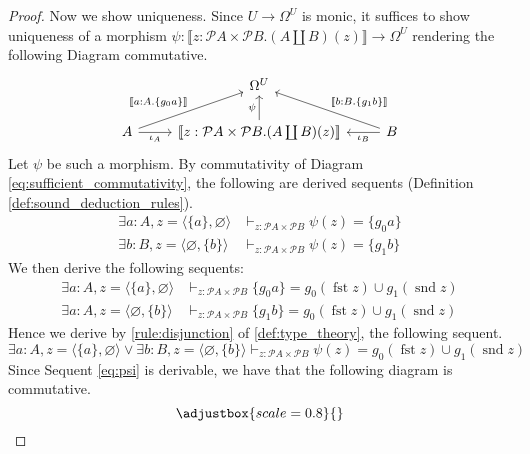 \documentclass{tac}
\newcommand{\call}[1]{\mathcal{#1}}
\newcommand{\lto}{\longrightarrow}
\begin{document}
\begin{proof}
		Now we show uniqueness. Since $U \lto \Omega^U$ is monic, it suffices to show uniqueness of a morphism $\psi: \llbracket z: \call{P}A \times \call{P}B.(A \coprod B)(z) \rrbracket \lto \Omega^U$ rendering the following Diagram commutative.
		\begin{equation}\label{eq:sufficient_commutativity}
			\begin{tikzcd}
				& \Omega^U\\
				A\arrow[ur,"{\llbracket a:A. \lbrace g_0a \rbrace\rrbracket}"]\arrow[r,swap,"{\iota_A}"] & \llbracket z : \call{P}A \times \call{P}B . (A \coprod B)(z)\rrbracket\arrow[u,"{\psi}"] & B\arrow[ul,swap,"{\llbracket b:B. \lbrace g_1b \rbrace\rrbracket}"]\arrow[l,"{\iota_B}"]
			\end{tikzcd}
		\end{equation}
		Let $\psi$ be such a morphism. By commutativity of Diagram \eqref{eq:sufficient_commutativity}, the following are derived sequents (Definition \ref{def:sound_deduction_rules}).
		\begin{align*}
			\exists a:A, z = \langle \lbrace a \rbrace, \varnothing \rangle &\vdash_{z:\call{P}A \times \call{P}B}\psi(z) = \lbrace g_0 a \rbrace\\
			\exists b:B, z = \langle \varnothing, \lbrace b \rbrace \rangle &\vdash_{z: \call{P}A \times \call{P}B} \psi(z) = \lbrace g_1 b \rbrace
		\end{align*}
		We then derive the following sequents:
		\begin{align*}
			\exists a:A, z = \langle \lbrace a \rbrace, \varnothing \rangle &\vdash_{z: \call{P}A \times \call{P}B}\lbrace g_0a\rbrace = g_0(\operatorname{fst}z)\cup g_1(\operatorname{snd}z)\\
			\exists a:A, z = \langle \varnothing, \lbrace b \rbrace \rangle &
			\vdash_{z: \call{P}A \times \call{P}B}\lbrace g_1b\rbrace = g_0(\operatorname{fst}z)\cup g_1(\operatorname{snd}z)
		\end{align*}
		Hence we derive by \eqref{rule:disjunction} of \ref{def:type_theory}, the following sequent.
		\begin{equation}\label{eq:psi}
			\exists a:A, z = \langle \lbrace a \rbrace, \varnothing \rangle \vee \exists b:B, z = \langle \varnothing, \lbrace b \rbrace \rangle \vdash_{z: \call{P}A \times \call{P}B}\psi(z) = g_0(\operatorname{fst}z) \cup g_1(\operatorname{snd}z)
		\end{equation}
		Since Sequent \eqref{eq:psi} is derivable, we have that the following diagram is commutative.
		\begin{equation}\adjustbox{scale=0.8}{
}
\end{equation}
\end{proof}
\end{document}
